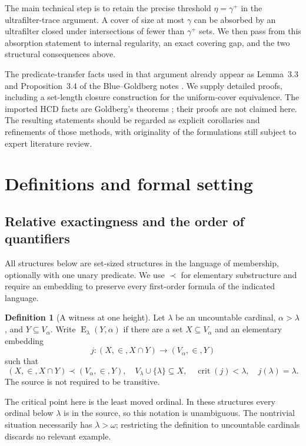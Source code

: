 \documentclass[11pt,letterpaper]{article}
\theoremstyle{definition}
\newtheorem{definition}{Definition}[section]
\newcommand{\crit}{\operatorname{crit}}
\newcommand{\Erel}{\operatorname{E}}
\begin{document}
The main technical step is to retain the precise threshold $\eta=\gamma^+$ in the ultrafilter-trace argument. A cover of size at most $\gamma$ can be absorbed by an ultrafilter closed under intersections of fewer than $\gamma^+$ sets. We then pass from this absorption statement to internal regularity, an exact covering gap, and the two structural consequences above.

The predicate-transfer facts used in that argument already appear as Lemma~3.3 and Proposition~3.4 of the Blue--Goldberg notes \cite{cover}. We supply detailed proofs, including a set-length closure construction for the uniform-cover equivalence. The imported HCD facts are Goldberg's theorems \cite{uniqueness}; their proofs are not claimed here. The resulting statements should be regarded as explicit corollaries and refinements of those methods, with originality of the formulations still subject to expert literature review.

\section{Definitions and formal setting}\label{sec:definitions}

\subsection{Relative exactingness and the order of quantifiers}

All structures below are set-sized structures in the language of membership, optionally with one unary predicate. We use $\prec$ for elementary substructure and require an embedding to preserve every first-order formula of the indicated language.

\begin{definition}[A witness at one height]\label{def:witness}
Let $\lambda$ be an uncountable cardinal, $\alpha>\lambda$, and $Y\subseteq V_\alpha$. Write $\Erel_\lambda(Y,\alpha)$ if there are a set $X\subseteq V_\alpha$ and an elementary embedding
\[
j:(X,\in,X\cap Y)\longrightarrow(V_\alpha,\in,Y)
\]
such that
\begin{equation}\label{eq:witness}
(X,\in,X\cap Y)\prec(V_\alpha,\in,Y),\quad
V_\lambda\cup\{\lambda\}\subseteq X,\quad
\crit(j)<\lambda,\quad j(\lambda)=\lambda.
\end{equation}
The source is not required to be transitive.
\end{definition}

The critical point here is the least moved ordinal. In these structures every ordinal below $\lambda$ is in the source, so this notation is unambiguous. The nontrivial situation necessarily has $\lambda>\omega$; restricting the definition to uncountable cardinals discards no relevant example.
\end{document}
